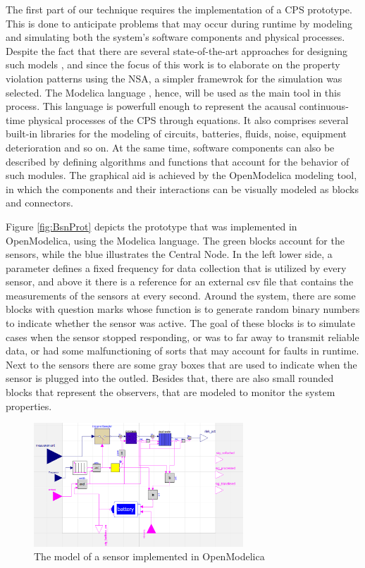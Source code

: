The first part of our technique requires the implementation of a CPS prototype. This is done to anticipate problems that may occur during runtime by modeling and simulating both the system's software components and physical processes. Despite the fact that there are several state-of-the-art approaches for designing such models \cite{baras2019formal} \cite{deng2019modeling} \cite{bouskela2022formal}, and since the focus of this work is to elaborate on the property violation patterns using the NSA, a simpler framewrok for the simulation was selected. The Modelica language \cite{Modelica}, hence, will be used as the main tool in this process. This language is powerfull enough to represent the acausal continuous-time physical processes of the CPS through equations. It also comprises several built-in libraries for the modeling of circuits, batteries, fluids, noise, equipment deterioration and so on. At the same time, software components can also be described by defining algorithms and functions that account for the behavior of such modules. The graphical aid is achieved by the OpenModelica \cite{OpenModelica} modeling tool, in which the components and their interactions can be visually modeled as blocks and connectors.


Figure \ref{fig:BsnProt} depicts the prototype that was implemented in OpenModelica, using the Modelica language. The green blocks account for the sensors, while the blue illustrates the Central Node. In the left lower side, a parameter defines a fixed frequency for data collection that is utilized by every sensor, and above it there is a reference for an external csv file that contains the measurements of the sensors at every second. Around the system, there are some blocks with question marks whose function is to generate random binary numbers to indicate whether the sensor was active. The goal of these blocks is to simulate cases when the sensor stopped responding, or was to far away to transmit reliable data, or had some malfunctioning of sorts that may account for faults in runtime. Next to the sensors there are some gray boxes that are used to indicate when the sensor is plugged into the outled. Besides that, there are also small rounded blocks that represent the observers, that are modeled to monitor the system properties.

\begin{figure}[!h]
	\centering
	\includegraphics[width=0.7\textwidth, keepaspectratio]{img/sensor_modelica.png}
	\caption{The model of a sensor implemented in OpenModelica}
	\label{fig:sensorProt}
\end{figure}

